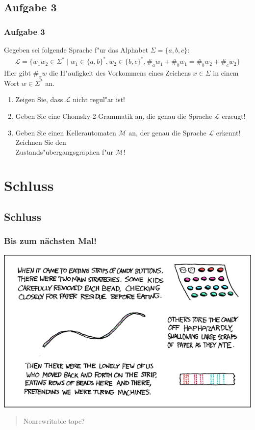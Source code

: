 \subsection{Aufgabe 3}
\begin{frame}
	\frametitle{Aufgabe 3}
	Gegeben sei folgende Sprache f"ur das Alphabet $\Sigma = \{a,b,c\}$:
	\begin{eqnarray*}
		\mathcal{L} = \{w_1w_2 \in \Sigma^* \; | \; w_1 \in \{a,b\}^*,w_2 \in \{b,c\}^*,
		\#_a w_1 + \#_b w_1 = \#_b w_2 + \#_c w_2\}
	\end{eqnarray*}
	Hier gibt $\#_x w$ die H"aufigkeit des Vorkommens eines Zeichens $x \in \Sigma$ in
	einem Wort $w \in \Sigma^*$ an.
	\begin{enumerate}
		\item Zeigen Sie, dass $\mathcal{L}$ nicht regul"ar ist!
		\item Geben Sie eine Chomsky-2-Grammatik an, die genau die Sprache $\mathcal{L}$
		erzeugt!
		\item Geben Sie einen Kellerautomaten $\mathcal{M}$ an, der genau die Sprache
		$\mathcal{L}$ erkennt! Zeichnen Sie den\\
		Zustands"ubergangsgraphen f"ur $\mathcal{M}$!
	\end{enumerate}
\end{frame}

\section{Schluss}
\subsection{Schluss}

\begin{frame}
\frametitle{Bis zum nächsten Mal!}
\begin{center}
  \includegraphics[height=0.8 \textheight]{images/xkcd_205.png} 
\end{center}

\begin{quote}\tiny{Nonrewritable tape?}
\end{quote}
\end{frame}

